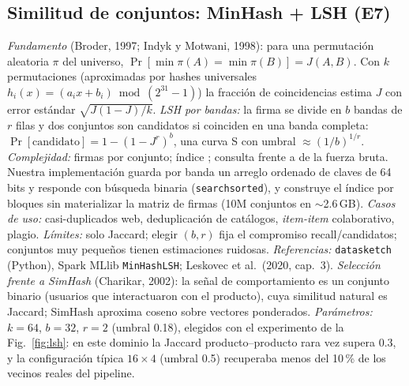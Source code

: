 \subsection{Similitud de conjuntos: MinHash + LSH (E7)}
\emph{Fundamento} (Broder, 1997; Indyk y Motwani, 1998): para una permutación aleatoria $\pi$ del universo, $\Pr[\min\pi(A)=\min\pi(B)]=J(A,B)$.
Con $k$ permutaciones (aproximadas por hashes universales $h_i(x)=(a_ix+b_i)\bmod(2^{31}-1)$) la fracción de coincidencias estima $J$ con error estándar
$\sqrt{J(1-J)/k}$. \emph{LSH por bandas:} la firma se divide en $b$ bandas de $r$ filas y dos conjuntos son candidatos si coinciden en una banda completa:
$\Pr[\text{candidato}]=1-(1-J^r)^b$, una curva S con umbral $\approx(1/b)^{1/r}$. \emph{Complejidad:} firmas  por conjunto; índice ;
consulta  frente a  de la fuerza bruta. Nuestra implementación guarda por banda un arreglo ordenado de claves de 64 bits
y responde con búsqueda binaria (\texttt{searchsorted}), y construye el índice por bloques sin materializar la matriz de firmas (10M conjuntos en $\sim$2.6\,GB).
\emph{Casos de uso:} casi-duplicados web, deduplicación de catálogos, \emph{item-item} colaborativo, plagio. \emph{Límites:} solo Jaccard; elegir $(b,r)$
fija el compromiso recall/candidatos; conjuntos muy pequeños tienen estimaciones ruidosas. \emph{Referencias:} \texttt{datasketch} (Python), Spark MLlib
\texttt{MinHashLSH}; Leskovec et al.\ (2020, cap.~3). \emph{Selección frente a SimHash} (Charikar, 2002): la señal de comportamiento es un conjunto binario
(usuarios que interactuaron con el producto), cuya similitud natural es Jaccard; SimHash aproxima coseno sobre vectores ponderados. \emph{Parámetros:}
$k=64$, $b=32$, $r=2$ (umbral 0.18), elegidos con el experimento de la Fig.~\ref{fig:lsh}: en este dominio la Jaccard producto–producto rara vez supera 0.3, y
la configuración típica $16\times4$ (umbral 0.5) recuperaba menos del 10\,\% de los vecinos reales del pipeline.

